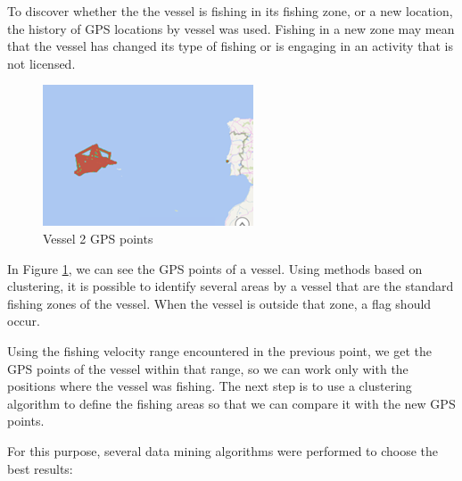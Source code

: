 To discover whether the
the vessel is fishing in its fishing zone, or a new location, the history of GPS locations by vessel was used.
Fishing in a new zone may mean that the vessel has changed its type of fishing or is engaging in an activity that is not licensed.


\begin{figure}[H]
\centering
\includegraphics[width=0.8\linewidth]{Chapters/img/gps_vessel2.png}
\caption{Vessel 2 GPS points}
\label{fig:gps_vessel2}
\end{figure}

In Figure \ref{fig:gps_vessel2}, we can see the GPS points of a vessel. Using methods based on clustering, it is possible to identify several areas by a vessel that are the standard fishing zones of the vessel. When the vessel is outside that zone, a flag should occur.

Using the fishing velocity range encountered in the previous point, we get the GPS points of the vessel within that range, so we can work only with the positions where the vessel was fishing. The next step is to use a clustering algorithm to define the fishing areas so that we can compare it with the new GPS points. 

For this purpose, several data mining algorithms were performed to choose the best results:

